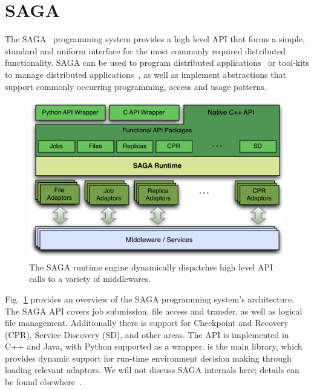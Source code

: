 \documentclass[3p,twocolumn]{elsarticle}
\begin{document}



\section{SAGA}
\label{sec:saga}

The SAGA~\cite{saga-core, Kaiser:2006qp} programming system provides a
high level API that forms a simple, standard and uniform interface for
the most commonly required distributed functionality.  SAGA can be
used to program distributed applications~\cite{saga_escience07,
saga_tg08} or tool-kits to manage distributed
applications~\cite{Luckow:2008xy}, as well as implement abstractions
that support commonly occurring programming, access and usage
patterns.

\begin{figure}[t]
 \dnnn
 \includegraphics[scale=0.5]{figures/saga-figure02.pdf}
 \caption{The SAGA runtime engine dynamically dispatches high level
          API calls to a variety of middlewares.}
 \label{fig:saga}
\end{figure}

Fig.~\ref{fig:saga} provides an overview of the SAGA programming
system's architecture.  The SAGA API covers job submission, file
access and transfer, as well as logical file management.  Additionally
there is support for Checkpoint and Recovery (CPR), Service Discovery
(SD), and other areas.  The API is implemented in C++ and Java, with
Python supported as a wrapper.  is the main library,
which provides dynamic support for run-time environment decision
making through loading relevant adaptors. We will not discuss SAGA
internals here; details can be found elsewhere~\cite{saga_url,Kaiser:2006qp}.
\end{document}
